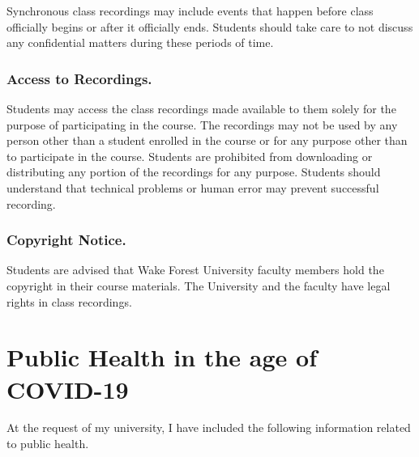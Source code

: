 Synchronous class recordings may include events that happen before class officially begins or after it officially ends. Students should take care to not discuss any confidential matters during these periods of time.

\hypertarget{access-to-recordings.}{%
\subsection{Access to Recordings.}\label{access-to-recordings.}}

Students may access the class recordings made available to them solely for the purpose of participating in the course. The recordings may not be used by any person other than a student enrolled in the course or for any purpose other than to participate in the course. Students are prohibited from downloading or distributing any portion of the recordings for any purpose. Students should understand that technical problems or human error may prevent successful recording.

\hypertarget{copyright-notice.}{%
\subsection{Copyright Notice.}\label{copyright-notice.}}

Students are advised that Wake Forest University faculty members hold the copyright in their course materials. The University and the faculty have legal rights in class recordings.

\hypertarget{public-health-in-the-age-of-covid-19}{%
\chapter{Public Health in the age of COVID-19}\label{public-health-in-the-age-of-covid-19}}

At the request of my university, I have included the following information related to public health.

